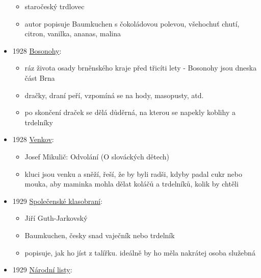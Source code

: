 \begin{itemize}
  \begin{itemize}
  \tightlist
  \item
    staročeský trdlovec
  \item
    autor popisuje Baumkuchen s čokoládovou polevou, všehochuť chutí,
    citron, vanilka, ananas, malina
  \end{itemize}
\item
  1928
  \href{https://ceskadigitalniknihovna.cz/view/uuid:d9b0f410-125b-11ed-8635-005056827e52?page=uuid\%3A82be2751-0e47-4147-a2f9-395b5608b5ce&fulltext=trdeln\%C3\%ADk\%20OR\%20trdeln\%C3\%ADky\%20OR\%20trdeln\%C3\%ADk\%C5\%AF&source=mzk}{Bosonohy}:

  \begin{itemize}
  \tightlist
  \item
    ráz života osady brněnského kraje před třicíti lety - Bosonohy jsou
    dneska část Brna
  \item
    dračky, draní peří, vzpomíná se na hody, masopusty, atd.
  \item
    po skončení draček se dělá důděrná, na kterou se napekly koblihy a
    trdelníky
  \end{itemize}
\item
  1928
  \href{https://ceskadigitalniknihovna.cz/uuid/uuid:25f83680-128e-11e8-8ee4-005056825209}{Venkov}:

  \begin{itemize}
  \tightlist
  \item
    Josef Mikulič: Odvolání (O slováckých dětech)
  \item
    kluci jsou venku a sněží, řeší, že by byli radši, kdyby padal cukr
    nebo mouka, aby maminka mohla dělat koláčů a trdelníků, kolik by
    chtěli
  \end{itemize}
\item
  1929
  \href{https://ceskadigitalniknihovna.cz/view/uuid:8eac0a2b-3229-4774-bc7b-59842402b9e4?page=uuid\%3Abd127f65-068f-11ee-8565-00155d01210b&source=svkhk}{Společenské
  klasobraní}:

  \begin{itemize}
  \tightlist
  \item
    Jiří Guth-Jarkovský
  \item
    Baumkuchen, česky snad vaječník nebo trdelník
  \item
    popisuje, jak ho jíst z talířku. ideálně by ho měla nakrátej osoba
    služebná
  \end{itemize}
\item
  1929
  \href{https://ceskadigitalniknihovna.cz/view/uuid:bf47407e-435d-11dd-b505-00145e5790ea?page=uuid\%3A2a4bcb83-435e-11dd-b505-00145e5790ea&fulltext=trdeln\%C3\%ADk\%20OR\%20trdeln\%C3\%ADky\%20OR\%20trdeln\%C3\%ADk\%C5\%AF&source=mzk}{Národní
  listy}:


\end{itemize}
